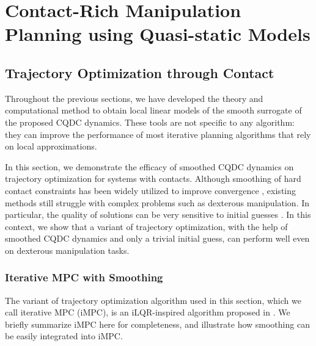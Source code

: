 \chapter{Contact-Rich Manipulation Planning using Quasi-static Models} \label{chapter:contact_rich_planning}

\section{Trajectory Optimization through Contact \label{sec:traj_opt}}
\noindent Throughout the previous sections, we have developed the theory and computational method to obtain local linear models of the smooth surrogate of the proposed CQDC dynamics. These tools are not specific to any algorithm: they can improve the performance of most iterative planning algorithms that rely on local approximations.

In this section, we demonstrate the efficacy of smoothed CQDC dynamics on trajectory optimization for systems with contacts.
Although smoothing of hard contact constraints has been widely utilized to improve convergence \cite{posa2014direct, howell2022dojo, howell2022trajectory}, existing methods still struggle with complex problems such as dexterous manipulation. In particular, the quality of solutions can be very sensitive to initial guesses \cite{onol2020tuning}.
In this context, we show that a variant of trajectory optimization, with the help of smoothed CQDC dynamics and only a trivial initial guess, can perform well even on dexterous manipulation tasks.

\subsection{Iterative MPC with Smoothing \label{sec:iMPC}}
The variant of trajectory optimization algorithm used in this section, which we call iterative MPC (iMPC), is an iLQR-inspired algorithm proposed in \cite{bundledgradients}. We briefly summarize iMPC here for completeness, and illustrate how smoothing can be easily integrated into iMPC.

